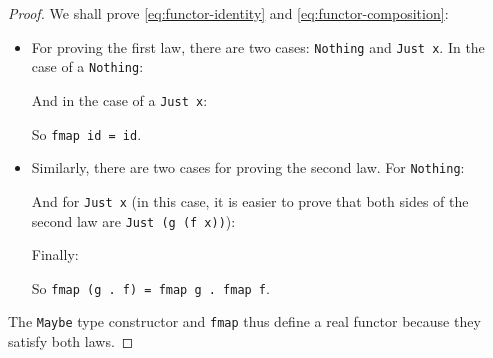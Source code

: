 \begin{example}
  \begin{proof}
    We shall prove \eqref{eq:functor-identity} and \eqref{eq:functor-composition}:
    \begin{itemize}
    \item
      For proving the first law, there are two cases: \texttt{Nothing}
      and \texttt{Just x}. In the case of a \texttt{Nothing}:
      \begin{steps}
      \end{steps}
      And in the case of a \texttt{Just x}:
      \begin{steps}
      \end{steps}
      So \texttt{fmap id = id}.
    \item
      Similarly, there are two cases for proving the second law. For
      \texttt{Nothing}:
      \begin{steps}
      \end{steps}
      And for \texttt{Just x} (in this case, it is easier to prove that
      both sides of the second law are \texttt{Just (g (f x))}):
      \begin{steps}
      \end{steps}
      Finally:
      \begin{steps}
      \end{steps}
      So \texttt{fmap (g . f) = fmap g . fmap f}.
    \end{itemize}
    The \texttt{Maybe} type constructor and \texttt{fmap} thus
    define a real functor because they satisfy both laws.
  \end{proof}
\end{example}

